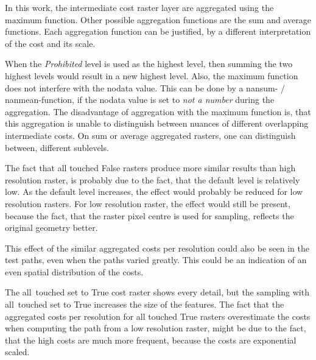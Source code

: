 In this work, the intermediate cost raster layer are aggregated using the maximum function. 
Other possible aggregation functions are the sum and average functions.
Each aggregation function can be justified, by a different interpretation of the cost and its scale.

When the \textit{Prohibited} level is used as the highest level, then summing the two highest levels would result in a new highest level. 
Also, the maximum function does not interfere with the nodata value. 
This can be done by a nansum- / nanmean-function, if the nodata value is set to \textit{not a number} during the aggregation.
The disadvantage of aggregation with the maximum function is, that this aggregation is unable to distinguish between nuances of different overlapping intermediate costs.
On sum or average aggregated rasters, one can distinguish between, different sublevels.

The fact that all touched False rasters produce more similar results than high resolution raster, is probably due to the fact, that the default level is relatively low.
As the default level increases, the effect would probably be reduced for low resolution rasters.
For low resolution raster, the effect would still be present, because the fact, that the raster pixel centre is used for sampling, reflects the original geometry better.

This effect of the similar aggregated costs per resolution could also be seen in the test paths, even when the paths varied greatly.
This could be an indication of an even spatial distribution of the costs.

The all~touched set to True cost raster shows every detail, but the sampling with all~touched set to True increases the size of the features.
The fact that the aggregated costs per resolution for all touched True rasters overestimate the costs when computing the path from a low resolution raster, might be due to the fact, that the high costs are much more frequent, because the costs are exponential scaled.

